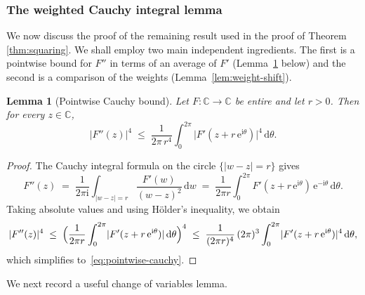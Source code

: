 \documentclass[a4paper,11pt,reqno]{amsart}
\numberwithin{equation}{section}
\theoremstyle{plain} %
\newtheorem{lemma}{Lemma}[section]
\theoremstyle{definition} %
\theoremstyle{remark}
\newcommand{\C}{\mathbb{C}}
\newcommand{\abs}[1]{\lvert #1 \rvert}
\newcommand{\dd}{\mathrm{d}}
\newcommand{\ee}{\mathrm{e}}
\newcommand{\ii}{\mathrm{i}}
\begin{document}
\subsubsection{The weighted Cauchy integral lemma}\label{sec:weighted-cauchy}
We now discuss the proof of the remaining result used in the proof of Theorem \ref{thm:squaring}. We shall employ two main independent ingredients. The first is a pointwise  bound for $F''$ in terms of an average of
$F'$ (Lemma~\ref{lem:pointwise-cauchy} below) and the second is a comparison
of the weights (Lemma~\ref{lem:weight-shift}). %

\begin{lemma}[Pointwise Cauchy bound]\label{lem:pointwise-cauchy}
Let $F \colon \C \to \C$ be entire and let $r > 0$.  Then for every
$z \in \C$,
\begin{equation}\label{eq:pointwise-cauchy}
\abs{F''(z)}^{4}
\;\le\;
\frac{1}{2\pi\, r^{4}} \int_{0}^{2\pi}
\abs{F'(z + r\,\ee^{\ii\theta})}^{4}\, \dd\theta.
\end{equation}
\end{lemma}

\begin{proof}
The Cauchy integral formula on the circle $\{\abs{w-z} = r\}$ gives
\[
F''(z)
\;=\;
\frac{1}{2\pi\ii}\int_{\abs{w-z}=r} \frac{F'(w)}{(w-z)^{2}}\,\dd w
\;=\;
\frac{1}{2\pi r}\int_{0}^{2\pi} F'(z + r\,\ee^{\ii\theta})\,
\ee^{-\ii\theta}\,\dd\theta.
\]
Taking absolute values and using H\"older's inequality, we obtain
\[
\abs{F''(z)}^{4}
\;\le\;
\Bigl(\frac{1}{2\pi r}\int_{0}^{2\pi}
\abs{F'(z + r\,\ee^{\ii\theta})}\,\dd\theta\Bigr)^{4}
\;\le\;
\frac{1}{(2\pi r)^{4}}\,(2\pi)^{3}
\int_{0}^{2\pi}\abs{F'(z + r\,\ee^{\ii\theta})}^{4}\,\dd\theta,
\]
which simplifies to~\eqref{eq:pointwise-cauchy}.
\end{proof}

We next record a useful change of variables lemma. %
\end{document}
